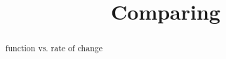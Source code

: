 \documentclass{ximera}
\title{Comparing}
\begin{document}
\begin{abstract}
function vs. rate of change
\end{abstract}
\maketitle
\end{document}
